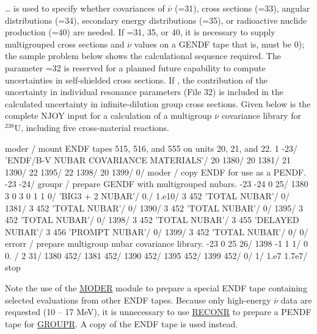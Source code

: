 \ldots\hspace{.1in} is used to specify whether
covariances of $\overline{\nu}$ (=31), cross
sections (=33), angular distributions (=34),
secondary energy distributions (=35), or radioactive nuclide
production (=40) are needed.  If =31, 35, or 40,
it is necessary to supply multigrouped
cross sections and $\overline{\nu}$ values on a GENDF tape
that is,  must be 0); the sample problem below shows
the calculational sequence required.  The parameter =32
is reserved for a planned future capability to compute
uncertainties in self-shielded cross sections.  If ,
the contribution of the uncertainty in individual resonance parameters
(File 32) is included in the calculated uncertainty in
infinite-dilution group cross sections.  Given below is the complete
NJOY input for a calculation of a multigroup $\overline{\nu}$
covariance library for $^{238}$U, including five cross-material
reactions.

\small
\begin{ccode}

   moder / mount ENDF tapes 515, 516, and 555 on units 20, 21, and 22.
   1 -23/
   'ENDF/B-V NUBAR COVARIANCE MATERIALS'/
   20 1380/
   20 1381/
   21 1390/
   22 1395/
   22 1398/
   20 1399/
   0/
   moder / copy ENDF for use as a PENDF.
   -23 -24/
   groupr / prepare GENDF with multigrouped nubars.
   -23 -24 0 25/
   1380 3 0 3 0 1 1 0/
   'BIG3 + 2 NUBAR'/
   0./
   1.e10/
   3 452 'TOTAL NUBAR'/
   0/
   1381/
   3 452 'TOTAL NUBAR'/
   0/
   1390/
   3 452 'TOTAL NUBAR'/
   0/
   1395/
   3 452 'TOTAL NUBAR'/
   0/
   1398/
   3 452 'TOTAL NUBAR'/
   3 455 'DELAYED NUBAR'/
   3 456 'PROMPT NUBAR'/
   0/
   1399/
   3 452 'TOTAL NUBAR'/
   0/
   0/
   errorr / prepare multigroup nubar covariance library.
   -23 0 25 26/
   1398 -1 1 1/
   0 0. /
   2 31/
   1380 452/
   1381 452/
   1390 452/
   1395 452/
   1399 452/
   0/
   1/
   1.e7 1.7e7/
   stop

\end{ccode}
\normalsize

Note the use of the \hyperlink{sMODERhy}{MODER} module
to prepare a special ENDF tape
containing selected evaluations from other ENDF tapes.  Because only
high-energy $\overline{\nu}$ data are requested (10 -- 17 MeV), it is
unnecessary to use \hyperlink{sRECONRhy}{RECONR} to prepare
a PENDF tape for \hyperlink{sGROUPRhy}{GROUPR}.  A copy
of the ENDF tape is used instead.


